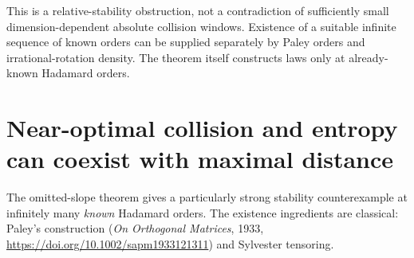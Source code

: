 This is a relative-stability obstruction, not a contradiction of
sufficiently small dimension-dependent absolute collision windows.
Existence of a suitable infinite sequence of known orders can be
supplied separately by Paley orders and irrational-rotation density.
The theorem itself constructs laws only at already-known Hadamard orders.
\section{Near-optimal collision and entropy can coexist with maximal distance}
\label{s25:sec:relative-sequence}

The omitted-slope theorem gives a particularly strong stability
counterexample at infinitely many \emph{known} Hadamard orders.
The existence ingredients are classical: Paley's construction
(\emph{On Orthogonal Matrices}, 1933,
\url{https://doi.org/10.1002/sapm1933121311}) and Sylvester tensoring.


